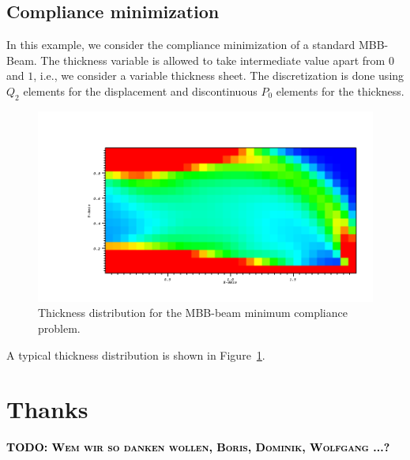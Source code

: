 \documentclass[prodmode,acmtoms]{acmsmall}
\numberwithin{equation}{section}
\newcommand{\todo}[1]{\textbf{\textsc{\textcolor{black}{TODO: #1}}}}
\begin{document}
\subsection{Compliance minimization}
In this example, we consider the compliance minimization of a standard MBB-Beam. 
The thickness variable is allowed to take intermediate value apart from $0$ and $1$,
i.e., we consider a variable thickness sheet. The discretization is done 
using $Q_2$ elements for the displacement and discontinuous $P_0$ elements for the 
thickness.
\begin{figure}
\centering
\includegraphics[width=1.\textwidth, viewport=150 0 1024 500, clip]{Pictures/MBB.png}
\caption{Thickness distribution for the MBB-beam minimum compliance problem.} 
\label{res:mbb}
\end{figure}
A typical thickness distribution is shown in Figure~\ref{res:mbb}.


\section*{Thanks}
\todo{Wem wir so danken wollen, Boris, Dominik, Wolfgang ...?}

%


%
\end{document}
